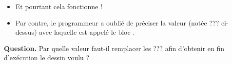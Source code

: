\documentclass[class=report,crop=false, 12pt]{standalone}
\begin{document}
\begin{enigme}
\begin{itemize}
  \item Et pourtant cela fonctionne !
  
   \item Par contre, le programmeur a oublié de préciser la valeur (notée \og{}???\fg{} ci-dessus) avec laquelle est appelé le bloc  .
\end{itemize}


\bigskip

\textbf{Question.} Par quelle valeur faut-il remplacer les \og{}???\fg{} afin d'obtenir en fin d’exécution le dessin voulu ?



\end{enigme}
\end{document}
